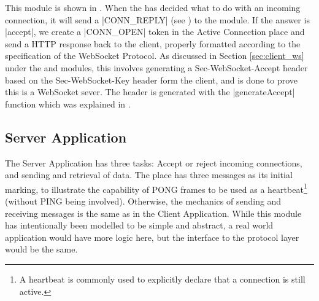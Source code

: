 		This module is shown in . When the  has decided what to do with an incoming connection, it will send
		a |CONN_REPLY| (see ) to the  module.
		If the answer is |accept|, we create a |CONN_OPEN| token in the
		Active Connection place and send a HTTP response back to the client, properly
		formatted according to the specification of the WebSocket Protocol. As
		discussed in Section \ref{sec:client_ws} under the 
		and  modules, this involves generating a
		Sec-WebSocket-Accept header based on the Sec-WebSocket-Key header form the
		client, and is done to prove this is a WebSocket sever. The header is
		generated with the |generateAccept| function which was explained in
		.
		
\subsection{Server Application}
	
	
	The Server Application has three tasks: Accept or reject incoming connections,
	and sending and retrieval of data. The  place has three
	messages as its initial marking, to illustrate the capability of PONG frames
	to be used as a heartbeat\footnote{A heartbeat is commonly used to explicitly
	declare that a connection is still active.} (without PING being involved).
	Otherwise, the mechanics of sending and receiving messages is the same as in
	the Client Application. While this module has intentionally been modelled to be
	simple and abstract, a real world application would have more logic here, but
	the interface to the protocol layer would be the same.
